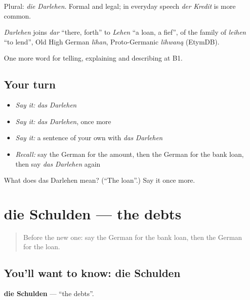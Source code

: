 Plural: \emph{die Darlehen}. Formal and legal; in everyday speech \emph{der Kredit} is more common.

\begin{cousinweb}
\emph{Darlehen} joins \emph{dar} \textquotedblleft{}there, forth\textquotedblright{} to \emph{Lehen} \textquotedblleft{}a loan, a fief\textquotedblright{}, of the family of \emph{leihen} \textquotedblleft{}to lend\textquotedblright{}, Old High German \emph{līhan}, Proto-Germanic \emph{līhwaną} (EtymDB).
\end{cousinweb}

\begin{grammarlens}[title={What you've built}]
One more word for telling, explaining and describing at B1.
\end{grammarlens}

\subsection*{Your turn}
\begin{itemize}
\raggedright
  \item \emph{Say it:} \emph{das Darlehen}
  \item \emph{Say it:} \emph{das Darlehen}, once more
  \item \emph{Say it:} a sentence of your own with \emph{das Darlehen}
  \item \emph{Recall:} say the German for the amount, then the German for the bank loan, then say \emph{das Darlehen} again
\end{itemize}

\begin{tcolorbox}[breakable,colback=teal!4,colframe=teal!35!black,title={Before you move on}]
What does das Darlehen mean? (\textquotedblleft{}The loan\textquotedblright{}.) Say it once more.
\end{tcolorbox}
\section[die Schulden]{die Schulden — the debts}

\label{lesson:GE-C388-schulden}



\begin{quote}
Before the new one: say the German for the bank loan, then the German for the loan.
\end{quote}

\subsection*{You'll want to know: die Schulden}
\textbf{die Schulden} — \textquotedblleft{}the debts\textquotedblright{}.

